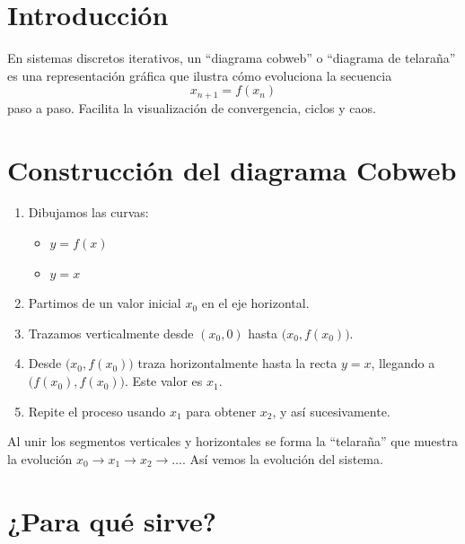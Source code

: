 \documentclass[
  11pt,
  a4paper,
  DIV=11,
  numbers=noendperiod]{scrreprt}
\providecommand{\tightlist}{%
  \setlength{\itemsep}{0pt}\setlength{\parskip}{0pt}}
\begin{document}
\section{Introducción}\label{introducciuxf3n-2}

En sistemas discretos iterativos, un ``diagrama cobweb'' o ``diagrama de
telaraña'' es una representación gráfica que ilustra cómo evoluciona la
secuencia \[
x_{n+1} = f(x_n)
\] paso a paso. Facilita la visualización de convergencia, ciclos y
caos.

\section{Construcción del diagrama
Cobweb}\label{construcciuxf3n-del-diagrama-cobweb}

\begin{enumerate}
\def\labelenumi{\arabic{enumi}.}
\tightlist
\item
  Dibujamos las curvas:

  \begin{itemize}
  \tightlist
  \item
    \(y = f(x)\)
  \item
    \(y = x\)\\
  \end{itemize}
\item
  Partimos de un valor inicial \(x_0\) en el eje horizontal.\\
\item
  Trazamos verticalmente desde \((x_0,0)\) hasta
  \(\bigl(x_0, f(x_0)\bigr)\).\\
\item
  Desde \(\bigl(x_0, f(x_0)\bigr)\) traza horizontalmente hasta la recta
  \(y=x\), llegando a \(\bigl(f(x_0), f(x_0)\bigr)\). Este valor es
  \(x_1\).\\
\item
  Repite el proceso usando \(x_1\) para obtener \(x_2\), y así
  sucesivamente.
\end{enumerate}

Al unir los segmentos verticales y horizontales se forma la ``telaraña''
que muestra la evolución \(x_0 \to x_1 \to x_2 \to \dots\). Así vemos la
evolución del sistema.

\section{¿Para qué sirve?}\label{para-quuxe9-sirve}
\end{document}
